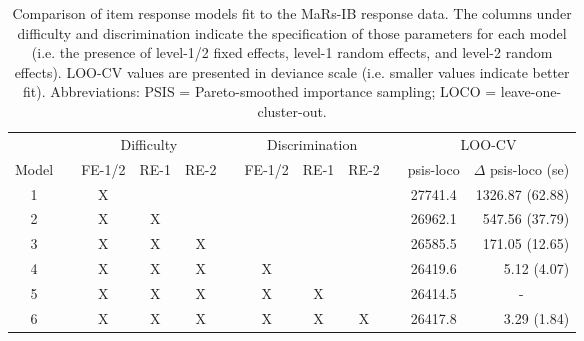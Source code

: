 \documentclass[a4paper,man,natbib,noextraspace]{apa6}
\begin{document}
\begin{table}
    \centering
    \begin{tabular*}{1.02\textwidth}{cccccccccccr}
    \toprule
    && \multicolumn{3}{c}{Difficulty} && \multicolumn{3}{c}{Discrimination} && \multicolumn{2}{c}{LOO-CV} \\
    \cmidrule(lr){3-5}\cmidrule(lr){7-9}\cmidrule(lr){11-12}
    Model && {\small FE-1/2} & {\small RE-1} & {\small RE-2} && {\small FE-1/2} & {\small RE-1} & {\small RE-2} && psis-loco & $\Delta$ psis-loco (se) \\
    \midrule
    1 && X &   &   &&   &   &   && 27741.4 & 1326.87 (62.88) \\
    2 && X & X &   &&   &   &   && 26962.1 & 547.56 (37.79) \\
    3 && X & X & X &&   &   &   && 26585.5 & 171.05 (12.65) \\
    4 && X & X & X && X &   &   && 26419.6 & 5.12 (4.07) \\
    5 && X & X & X && X & X &   && 26414.5 & \multicolumn{1}{c}{-} \\
    6 && X & X & X && X & X & X && 26417.8 & 3.29 (1.84) \\
    \bottomrule
    \end{tabular*}
    \caption{\label{tab:2}\normalfont Comparison of item response models fit to the MaRs-IB response data. The columns under difficulty and discrimination indicate the specification of those parameters for each model (i.e. the presence of level-1/2 fixed effects, level-1 random effects, and level-2 random effects). LOO-CV values are presented in deviance scale (i.e. smaller values indicate better fit). Abbreviations: PSIS = Pareto-smoothed importance sampling; LOCO = leave-one-cluster-out.}
    \label{table:2}
\end{table}
\end{document}
